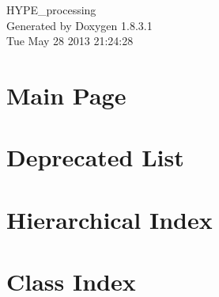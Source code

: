 \documentclass{book}
\begin{document}
\hypersetup{pageanchor=false,citecolor=blue}
\begin{titlepage}
\vspace*{7cm}
\begin{center}
{\Large H\-Y\-P\-E\-\_\-processing }\\
\vspace*{1cm}
{\large Generated by Doxygen 1.8.3.1}\\
\vspace*{0.5cm}
{\small Tue May 28 2013 21:24:28}\\
\end{center}
\end{titlepage}
\clearemptydoublepage
{}
\tableofcontents
\clearemptydoublepage
{}
\hypersetup{pageanchor=true,citecolor=blue}
\chapter{Main Page}
\label{index}\hypertarget{index}{}
\chapter{Deprecated List}
\label{deprecated}
\hypertarget{deprecated}{}

\chapter{Hierarchical Index}

\chapter{Class Index}

\end{document}
